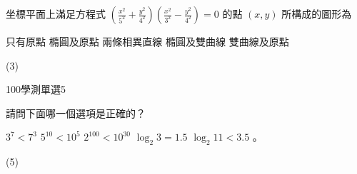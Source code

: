 \begin{QUESTIONS}
\begin{QUESTION}
\begin{QBODY}
			坐標平面上滿足方程式 $(\frac{x^2}{5^2} + \frac{y^2}{4^2})(\frac{x^2}{3^2} - \frac{y^2}{4^2})=0$ 的點 $(x,y)$ 所構成的圖形為 \quad 
			\begin{QOPS} 
                \QOP 只有原點 
				\QOP 橢圓及原點 
				\QOP 兩條相異直線 
				\QOP 橢圓及雙曲線 
				\QOP 雙曲線及原點
			\end{QOPS}
        \end{QBODY}
        \begin{QFROMS}
        \end{QFROMS}
        \begin{QTAGS}\end{QTAGS}
        \begin{QANS}
            (3)
        \end{QANS}
        \begin{QSOLLIST}
        \end{QSOLLIST}
        \begin{QEMPTYSPACE}
        \end{QEMPTYSPACE}
    \end{QUESTION}
    \begin{QUESTION}
        \begin{ExamInfo}{100}{學測}{單選}{5}
        \end{ExamInfo}
        \begin{ExamAnsRateInfo}{67}{94}{77}{30}
        \end{ExamAnsRateInfo}
        \begin{QBODY}
		請問下面哪一個選項是正確的？ 
		\begin{QOPS} 
			\QOP $3^7 < 7^3$ 
			\QOP $5^{10} < 10^{5}$ 
			\QOP $2^{100} < 10^{30}$ 
			\QOP $\log_2{3} = 1.5$ 
			\QOP $\log_2{11} < 3.5$ 。
		\end{QOPS}
        \end{QBODY}
        \begin{QFROMS}
        \end{QFROMS}
        \begin{QTAGS}\end{QTAGS}
        \begin{QANS}
            (5)
        \end{QANS}
        \begin{QSOLLIST}
        \end{QSOLLIST}
        \begin{QEMPTYSPACE}
        \end{QEMPTYSPACE}
    \end{QUESTION}

\end{QUESTIONS}
